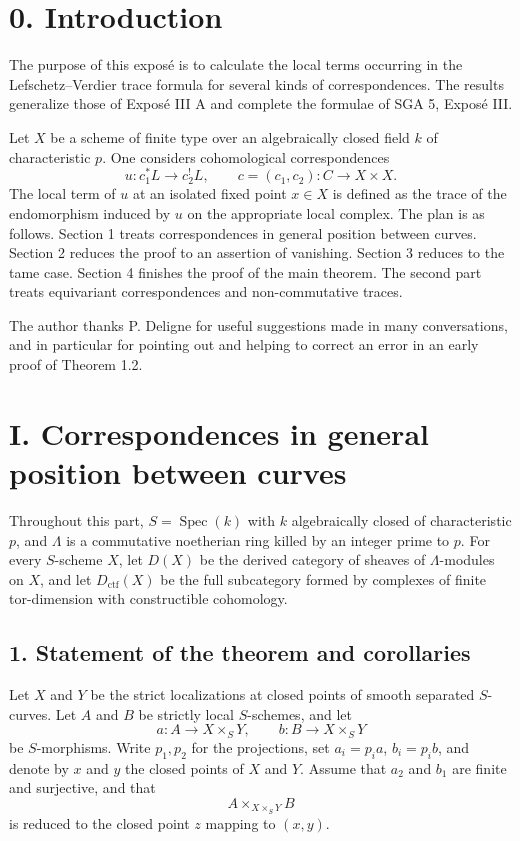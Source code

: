 \documentclass[12pt]{article}
\newcommand{\Spec}{\operatorname{Spec}}
\begin{document}
\section*{0. Introduction}
The purpose of this exposé is to calculate the local terms occurring in the Lefschetz--Verdier trace formula for several kinds of correspondences. The results generalize those of Exposé III A and complete the formulae of SGA 5, Exposé III.

Let $X$ be a scheme of finite type over an algebraically closed field $k$ of characteristic $p$. One considers cohomological correspondences
\[
   u:c_1^*L\to c_2^!L,
   \qquad
   c=(c_1,c_2):C\to X\times X.
\]
The local term of $u$ at an isolated fixed point $x\in X$ is defined as the trace of the endomorphism induced by $u$ on the appropriate local complex. The plan is as follows. Section 1 treats correspondences in general position between curves. Section 2 reduces the proof to an assertion of vanishing. Section 3 reduces to the tame case. Section 4 finishes the proof of the main theorem. The second part treats equivariant correspondences and non-commutative traces.

The author thanks P. Deligne for useful suggestions made in many conversations, and in particular for pointing out and helping to correct an error in an early proof of Theorem 1.2.

\section*{I. Correspondences in general position between curves}

Throughout this part, $S=\Spec(k)$ with $k$ algebraically closed of characteristic $p$, and $\Lambda$ is a commutative noetherian ring killed by an integer prime to $p$. For every $S$-scheme $X$, let $D(X)$ be the derived category of sheaves of $\Lambda$-modules on $X$, and let $D_{\mathrm{ctf}}(X)$ be the full subcategory formed by complexes of finite tor-dimension with constructible cohomology.

\subsection*{1. Statement of the theorem and corollaries}
Let $X$ and $Y$ be the strict localizations at closed points of smooth separated $S$-curves. Let $A$ and $B$ be strictly local $S$-schemes, and let
\[
   a:A\to X\times_S Y,
   \qquad
   b:B\to X\times_S Y
\]
be $S$-morphisms. Write $p_1,p_2$ for the projections, set $a_i=p_ia$, $b_i=p_ib$, and denote by $x$ and $y$ the closed points of $X$ and $Y$. Assume that $a_2$ and $b_1$ are finite and surjective, and that
\[
   A\times_{X\times_SY}B
\]
is reduced to the closed point $z$ mapping to $(x,y)$.
\end{document}
